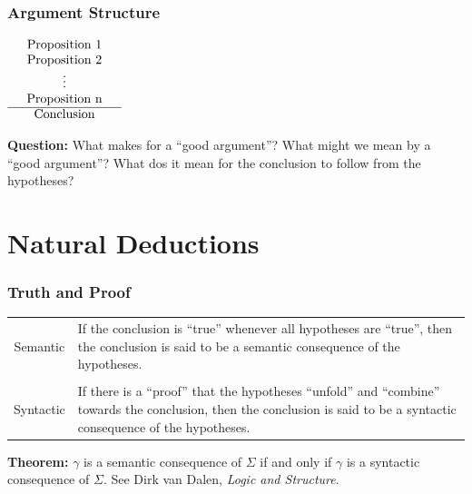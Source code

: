 \documentclass{beamer}
\begin{document}
\begin{frame}
	\frametitle{Argument Structure}
	\begin{center}
		$\begin{array}{ l c r }			
			& \textnormal{Proposition 1} & \\
			& \textnormal{Proposition 2} & \\
			& \vdots & \\
			& \textnormal{Proposition n} & \\
			\cline{1 - 3} 
			& \textnormal{Conclusion} & 	
		\end{array}$
	\end{center}

	\vspace{10mm}

{\bf Question:} What makes for a ``good argument''? What might we mean by a ``good argument''? What dos it mean for the conclusion to follow from the hypotheses? 
\end{frame}

\section{Natural Deductions}

\begin{frame}
	\frametitle{Truth and Proof}

	\begin{table}[h]
		\centering
		\begin{tabular}{c  p{}}
		Semantic & If the conclusion is ``true'' whenever all hypotheses are ``true'', then the conclusion is said to be a semantic consequence of the hypotheses. \\

		\vspace{0.20mm} & \\

		Syntactic & If there is a ``proof'' that the hypotheses ``unfold'' and ``combine'' towards the conclusion, then the conclusion is said to be a syntactic consequence of the hypotheses. 
		\end{tabular}
	\end{table}

	\vspace{5mm}

	{\bf Theorem:} $\gamma$ is a semantic consequence of $\Sigma$ if and only if $\gamma$ is a syntactic consequence of $\Sigma$. See Dirk van Dalen, \emph{Logic and Structure}. 	
\end{frame}
\end{document}
